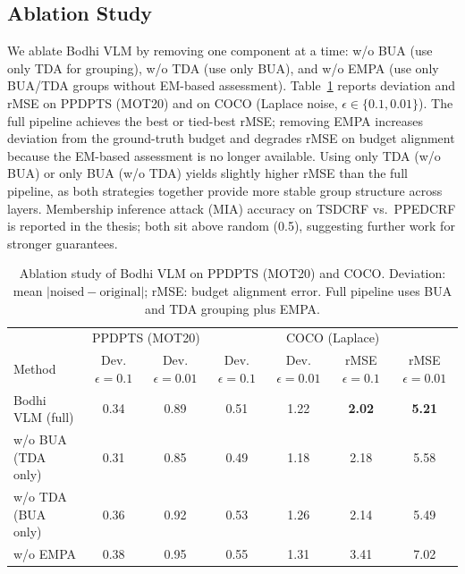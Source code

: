 \documentclass[journal,transmag]{IEEEtran}
\begin{document}
\subsection{Ablation Study}
We ablate Bodhi VLM by removing one component at a time: w/o BUA (use only TDA for grouping), w/o TDA (use only BUA), and w/o EMPA (use only BUA/TDA groups without EM-based assessment). Table~\ref{tab:ablation} reports deviation and rMSE on PPDPTS (MOT20) and on COCO (Laplace noise, $\epsilon \in \{0.1, 0.01\}$). The full pipeline achieves the best or tied-best rMSE; removing EMPA increases deviation from the ground-truth budget and degrades rMSE on budget alignment because the EM-based assessment is no longer available. Using only TDA (w/o BUA) or only BUA (w/o TDA) yields slightly higher rMSE than the full pipeline, as both strategies together provide more stable group structure across layers. Membership inference attack (MIA) accuracy on TSDCRF vs.\ PPEDCRF is reported in the thesis; both sit above random (0.5), suggesting further work for stronger guarantees.

\begin{table}[t]
\centering
\caption{Ablation study of Bodhi VLM on PPDPTS (MOT20) and COCO. Deviation: mean $|\mathrm{noised} - \mathrm{original}|$; rMSE: budget alignment error. Full pipeline uses BUA and TDA grouping plus EMPA.}
\label{tab:ablation}
\begin{tabular}{l|cc|cccc}
\hline
& \multicolumn{2}{c|}{PPDPTS (MOT20)} & \multicolumn{4}{c}{COCO (Laplace)} \\
Method & Dev. $\epsilon{=}0.1$ & Dev. $\epsilon{=}0.01$ & Dev. $\epsilon{=}0.1$ & Dev. $\epsilon{=}0.01$ & rMSE $\epsilon{=}0.1$ & rMSE $\epsilon{=}0.01$ \\
\hline
Bodhi VLM (full) & 0.34 & 0.89 & 0.51 & 1.22 & \textbf{2.02} & \textbf{5.21} \\
w/o BUA (TDA only) & 0.31 & 0.85 & 0.49 & 1.18 & 2.18 & 5.58 \\
w/o TDA (BUA only) & 0.36 & 0.92 & 0.53 & 1.26 & 2.14 & 5.49 \\
w/o EMPA & 0.38 & 0.95 & 0.55 & 1.31 & 3.41 & 7.02 \\
\hline
\end{tabular}
\end{table}
\end{document}
